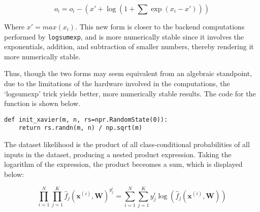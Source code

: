 \begin{equation}
o_i = o_i - (x' + \log(1 + \sum \exp(x_i - x')))
\end{equation} 

Where $x' = max(x_i)$. This new form is closer to the backend computations performed by \verb+logsumexp+, and is more numerically stable since it involves the exponentials, addition, and subtraction of smaller numbers, thereby rendering it more numerically stable.

Thus, though the two forms may seem equivalent from an algebraic standpoint, due to the limitations of the hardware involved in the computations, the `logsumexp' trick yields better, more numerically stable results. The code for the function is shown below.

\begin{verbatim}
def init_xavier(m, n, rs=npr.RandomState(0)):
    return rs.randn(m, n) / np.sqrt(m)
\end{verbatim}

\newpage
{}
The dataset likelihood is the product of all class-conditional probabilities of all inputs in the dataset, producing a nested product expression. Taking the logarithm of the expression, the product beceomes a sum, which is displayed below:

\begin{equation}
\prod_{i = 1}^N \prod_{j=1}^K  \hat{f}_{j} (\mathbf{x}^{(i)}, \mathbf{W}) ^{y_{j}^{i}} = \sum_{i = 1}^N \sum_{j=1}^K y_{j}^{i} \log(\hat{f}_{j} (\mathbf{x}^{(i)}, \mathbf{W}))
\end{equation}

